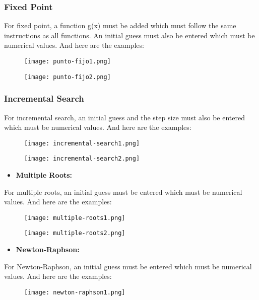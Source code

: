 \documentclass{uofa-eng-assignment}
\begin{document}
\subsubsection{Fixed Point}
For fixed point, a function g(x) must be added which must follow the same instructions as all functions. An initial guess must also be entered which must be numerical values. And here are the examples:
\begin{figure}[H]
    \centering
    \texttt{[image: punto-fijo1.png]}
\end{figure}

\begin{figure}[H]
    \centering
    \texttt{[image: punto-fijo2.png]}
\end{figure}
\subsubsection{Incremental Search}
For incremental search, an initial guess and the step size must also be entered which must be numerical values. And here are the examples:
\begin{figure}[H]
    \centering
    \texttt{[image: incremental-search1.png]}
\end{figure}

\begin{figure}[H]
    \centering
    \texttt{[image: incremental-search2.png]}
\end{figure}
\begin{itemize}
    \item \textbf{Multiple Roots:}
\end{itemize}
For multiple roots, an initial guess must be entered which must be numerical values. And here are the examples:
\begin{figure}[H]
    \centering
    \texttt{[image: multiple-roots1.png]}

\end{figure}

\begin{figure}[H]
    \centering
    \texttt{[image: multiple-roots2.png]}
\end{figure}
\begin{itemize}
    \item \textbf{Newton-Raphson:}
\end{itemize}
For Newton-Raphson, an initial guess must be entered which must be numerical values. And here are the examples:
\begin{figure}[H]
    \centering
    \texttt{[image: newton-raphson1.png]}
\end{figure}
\end{document}
